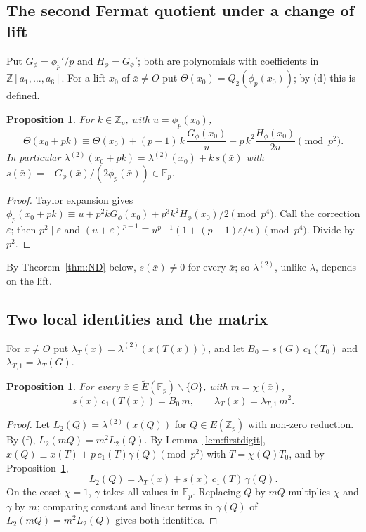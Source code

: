 \documentclass[11pt,a4paper]{amsart}
\newcommand{\Z}{\mathbb{Z}}
\newcommand{\Zp}{\mathbb{Z}_p}
\newcommand{\Fp}{\mathbb{F}_p}
\newcommand{\Et}{\widetilde{E}}
\theoremstyle{plain}
\newtheorem{proposition}[theorem]{Proposition}
\theoremstyle{definition}
\theoremstyle{remark}
\begin{document}
\subsection{The second Fermat quotient under a change of lift}
Put $G_\phi=\phi_p'/p$ and $H_\phi=G_\phi'$; both are polynomials with coefficients in $\Z[a_1,\dots,a_6]$. For a lift $x_0$ of $\bar x\ne O$ put $\Theta(x_0)=Q_2(\phi_p(x_0))$; by (d) this is defined.

\begin{proposition}\label{prop:lift}
For $k\in\Zp$, with $u=\phi_p(x_0)$,
\[
\Theta(x_0+pk)\equiv\Theta(x_0)+(p-1)\,k\,\frac{G_\phi(x_0)}u-p\,k^2\frac{H_\phi(x_0)}{2u}\pmod{p^2}.
\]
In particular $\lambda^{(2)}(x_0+pk)=\lambda^{(2)}(x_0)+k\,s(\bar x)$ with $s(\bar x)=-G_\phi(\bar x)/(2\phi_p(\bar x))\in\Fp$.
\end{proposition}

\begin{proof}
Taylor expansion gives $\phi_p(x_0+pk)\equiv u+p^2kG_\phi(x_0)+p^3k^2H_\phi(x_0)/2\pmod{p^4}$. Call the correction $\varepsilon$; then $p^2\mid\varepsilon$ and $(u+\varepsilon)^{p-1}\equiv u^{p-1}(1+(p-1)\varepsilon/u)\pmod{p^4}$. Divide by $p^2$.
\end{proof}

By Theorem~\ref{thm:ND} below, $s(\bar x)\ne0$ for every $\bar x$; so $\lambda^{(2)}$, unlike $\lambda$, depends on the lift.

\subsection{Two local identities and the matrix}
For $\bar x\ne O$ put $\lambda_T(\bar x)=\lambda^{(2)}(x(T(\bar x)))$, and let $B_0=s(G)\,c_1(T_0)$ and $\lambda_{T,1}=\lambda_T(G)$.

\begin{proposition}\label{prop:local}
For every $\bar x\in\Et(\Fp)\smallsetminus\{O\}$, with $m=\chi(\bar x)$,
\[
s(\bar x)\,c_1(T(\bar x))=B_0\,m,\qquad \lambda_T(\bar x)=\lambda_{T,1}\,m^2 .
\]
\end{proposition}

\begin{proof}
Let $L_2(Q)=\lambda^{(2)}(x(Q))$ for $Q\in E(\Zp)$ with non-zero reduction. By (f), $L_2(mQ)=m^2L_2(Q)$. By Lemma~\ref{lem:firstdigit}, $x(Q)\equiv x(T)+p\,c_1(T)\gamma(Q)\pmod{p^2}$ with $T=\chi(Q)T_0$, and by Proposition~\ref{prop:lift},
\[
L_2(Q)=\lambda_T(\bar x)+s(\bar x)\,c_1(T)\,\gamma(Q).
\]
On the coset $\chi=1$, $\gamma$ takes all values in $\Fp$. Replacing $Q$ by $mQ$ multiplies $\chi$ and $\gamma$ by $m$; comparing constant and linear terms in $\gamma(Q)$ of $L_2(mQ)=m^2L_2(Q)$ gives both identities.
\end{proof}
\end{document}
